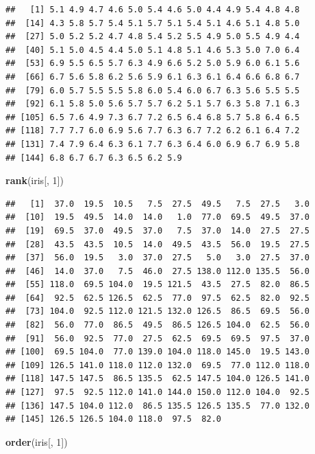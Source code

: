 \documentclass[twoside,symmetric]{book}
\newenvironment{Shaded}{}{}
\newcommand{\DecValTok}[1]{#1}
\newcommand{\KeywordTok}[1]{\textbf{#1}}
\newcommand{\NormalTok}[1]{#1}
\begin{document}
\begin{verbatim}
##   [1] 5.1 4.9 4.7 4.6 5.0 5.4 4.6 5.0 4.4 4.9 5.4 4.8 4.8
##  [14] 4.3 5.8 5.7 5.4 5.1 5.7 5.1 5.4 5.1 4.6 5.1 4.8 5.0
##  [27] 5.0 5.2 5.2 4.7 4.8 5.4 5.2 5.5 4.9 5.0 5.5 4.9 4.4
##  [40] 5.1 5.0 4.5 4.4 5.0 5.1 4.8 5.1 4.6 5.3 5.0 7.0 6.4
##  [53] 6.9 5.5 6.5 5.7 6.3 4.9 6.6 5.2 5.0 5.9 6.0 6.1 5.6
##  [66] 6.7 5.6 5.8 6.2 5.6 5.9 6.1 6.3 6.1 6.4 6.6 6.8 6.7
##  [79] 6.0 5.7 5.5 5.5 5.8 6.0 5.4 6.0 6.7 6.3 5.6 5.5 5.5
##  [92] 6.1 5.8 5.0 5.6 5.7 5.7 6.2 5.1 5.7 6.3 5.8 7.1 6.3
## [105] 6.5 7.6 4.9 7.3 6.7 7.2 6.5 6.4 6.8 5.7 5.8 6.4 6.5
## [118] 7.7 7.7 6.0 6.9 5.6 7.7 6.3 6.7 7.2 6.2 6.1 6.4 7.2
## [131] 7.4 7.9 6.4 6.3 6.1 7.7 6.3 6.4 6.0 6.9 6.7 6.9 5.8
## [144] 6.8 6.7 6.7 6.3 6.5 6.2 5.9
\end{verbatim}

\begin{Shaded}
\begin{Highlighting}[]
\KeywordTok{rank}\NormalTok{(iris[, }\DecValTok{1}\NormalTok{])}
\end{Highlighting}
\end{Shaded}

\begin{verbatim}
##   [1]  37.0  19.5  10.5   7.5  27.5  49.5   7.5  27.5   3.0
##  [10]  19.5  49.5  14.0  14.0   1.0  77.0  69.5  49.5  37.0
##  [19]  69.5  37.0  49.5  37.0   7.5  37.0  14.0  27.5  27.5
##  [28]  43.5  43.5  10.5  14.0  49.5  43.5  56.0  19.5  27.5
##  [37]  56.0  19.5   3.0  37.0  27.5   5.0   3.0  27.5  37.0
##  [46]  14.0  37.0   7.5  46.0  27.5 138.0 112.0 135.5  56.0
##  [55] 118.0  69.5 104.0  19.5 121.5  43.5  27.5  82.0  86.5
##  [64]  92.5  62.5 126.5  62.5  77.0  97.5  62.5  82.0  92.5
##  [73] 104.0  92.5 112.0 121.5 132.0 126.5  86.5  69.5  56.0
##  [82]  56.0  77.0  86.5  49.5  86.5 126.5 104.0  62.5  56.0
##  [91]  56.0  92.5  77.0  27.5  62.5  69.5  69.5  97.5  37.0
## [100]  69.5 104.0  77.0 139.0 104.0 118.0 145.0  19.5 143.0
## [109] 126.5 141.0 118.0 112.0 132.0  69.5  77.0 112.0 118.0
## [118] 147.5 147.5  86.5 135.5  62.5 147.5 104.0 126.5 141.0
## [127]  97.5  92.5 112.0 141.0 144.0 150.0 112.0 104.0  92.5
## [136] 147.5 104.0 112.0  86.5 135.5 126.5 135.5  77.0 132.0
## [145] 126.5 126.5 104.0 118.0  97.5  82.0
\end{verbatim}

\begin{Shaded}
\begin{Highlighting}[]
\KeywordTok{order}\NormalTok{(iris[, }\DecValTok{1}\NormalTok{])}
\end{Highlighting}
\end{Shaded}
\end{document}
